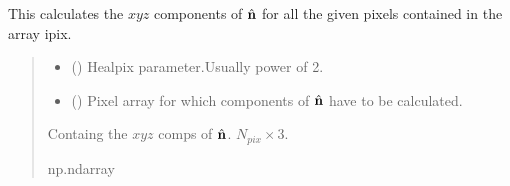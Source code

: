 \documentclass[a4paper,11pt,oneside,english,openany]{sphinxmanual}
\begin{document}
\begin{fulllineitems}
\label{\detokenize{simvis:simvis.hat_n}}
\pysigstartsignatures
{}
\pysigstopsignatures
\sphinxAtStartPar
This calculates the \(xyz\) components of \(\hat{\bf n}\) for all the given pixels contained in the array ipix.
\begin{quote}\begin{description}
\begin{itemize}
\item {} 
\sphinxAtStartPar
{} () \textendash{} Healpix parameter.Usually power of 2.

\item {} 
\sphinxAtStartPar
{} () \textendash{} Pixel array for which components of \(\hat{\bf n}\) have to be calculated.

\end{itemize}

\sphinxAtStartPar
{} \textendash{} Containg the \(xyz\) comps of \(\hat{\bf n}\). \(N_{pix} \times 3\).

\sphinxAtStartPar
np.ndarray

\end{description}\end{quote}

\end{fulllineitems}

\end{document}
